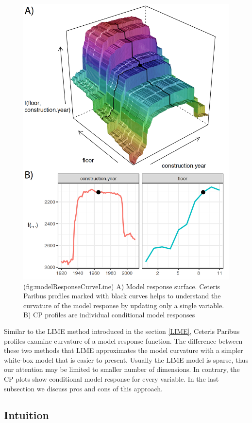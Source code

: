 \documentclass[]{krantz}
\theoremstyle{definition}
\theoremstyle{definition}
\theoremstyle{definition}
\theoremstyle{remark}
\begin{document}
\begin{figure}

{\centering \includegraphics[width=0.7\linewidth]{figure/model_response_line} 

}

\caption{(fig:modelResponseCurveLine) A) Model response surface. Ceteris Paribus profiles marked with black curves helps to understand the curvature of the model response by updating only a single variable. B) CP profiles are individual conditional model responses}\label{fig:modelResponseCurveLine}
\end{figure}

Similar to the LIME method introduced in the section \ref{LIME}, Ceteris
Paribus profiles examine curvature of a model response function. The
difference between these two methods that LIME approximates the model
curvature with a simpler white-box model that is easier to present.
Usually the LIME model is sparse, thus our attention may be limited to
smaller number of dimensions. In contrary, the CP plots show conditional
model response for every variable. In the last subsection we discuss
pros and cons of this approach.

\hypertarget{intuition-5}{%
\subsection{Intuition}\label{intuition-5}}
\end{document}
